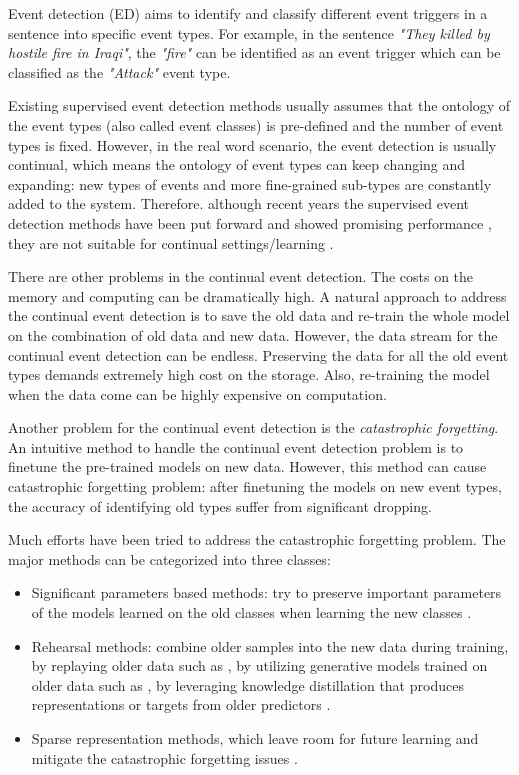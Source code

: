 Event detection (ED) aims to identify and classify different event triggers in a sentence into specific event types. For example, in the sentence \textit{"They killed by hostile fire in Iraqi"}, the \textit{"fire"} can be identified as an event trigger which can be classified as the \textit{"Attack"} event type.

Existing supervised event detection methods usually assumes that the ontology of the event types (also called event classes) is pre-defined and the number of event types is fixed. However, in the real word scenario, the event detection is usually continual, which means the ontology of event types can keep changing and expanding: new types of events and more fine-grained sub-types are constantly added to the system. Therefore. although recent years the supervised event detection methods have been put forward and showed promising performance \citep{chen2015event, du2020event, liu2020event, lu2021text2event}, they are not suitable for continual settings/learning \citep{ring1994continual, thrun1998lifelong, cao2020incremental}. 

There are other problems in the continual event detection. The costs on the memory and computing can be dramatically high. A natural approach to address the continual event detection is to save the old data and re-train the whole model on the combination of old data and new data. However, the data stream for the continual event detection can be endless. Preserving the data for all the old event types demands extremely high cost on the storage. Also, re-training the model when the data come can be highly expensive on computation. 

Another problem for the continual event detection is the \textit{catastrophic forgetting}\citep{mccloskey1989catastrophic, french1999catastrophic}. An intuitive method to handle the continual event detection problem is to finetune the pre-trained models on new data. However, this method can cause catastrophic forgetting problem: after finetuning the models on new event types, the accuracy of identifying old types suffer from significant dropping. 

Much efforts have been tried to address the catastrophic forgetting problem. The major methods can be categorized into three classes: 
\begin{itemize}[noitemsep]
  \item Significant parameters based methods: try to preserve important parameters of the models learned on the old classes when learning the new classes \citep{kirkpatrick2017overcoming, aljundi2018memory}.
  \item Rehearsal methods: combine older samples into the new data during training, by replaying older data such as \citep{rebuffi2017icarl, hou2019learning}, by utilizing generative models trained on older data such as          \citep{shin2017continual}, by leveraging knowledge distillation that produces representations or targets from older predictors \citep{li2017learning, cao2020incremental}.
  \item Sparse representation methods, which leave room for future learning and mitigate the catastrophic forgetting issues \citep{liu2019utility, aljundi2018selfless}.
\end{itemize}


